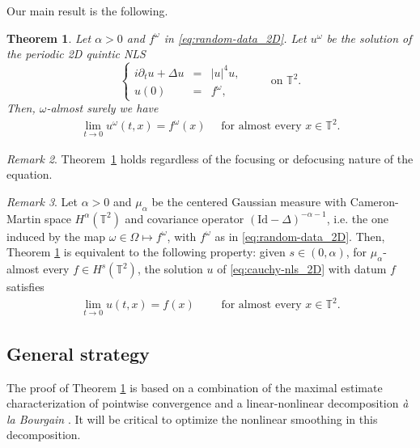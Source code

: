 \documentclass[11pt, xcolor = dvipsnames,reqno
]{amsart}
\newtheorem{thm}{Theorem}[section]
\theoremstyle{definition}
\theoremstyle{remark}
\newtheorem{rmk}[thm]{Remark}
\begin{document}
    Our main result is the following.
    \begin{thm}\label{thm:pconv}
     Let $\alpha > 0$ and $f^{\omega}$ in \eqref{eq:random-data_2D}. 
     Let $u^{\omega}$ be the solution of the periodic 2D quintic NLS 
     \begin{equation}\label{eq:cauchy-nls_2D}
		\left\{
		\begin{array}{rcl}
			i\partial_t u + \Delta u & = & |u|^4 u, 
			\\
			u(0) & = & f^\omega,
		\end{array}
		\right.
        \qquad \text{ on } \mathbb T^2. 
	\end{equation}
    Then, $\omega$-almost surely we have
    \begin{align}\label{eq:cauchy-nls_2D_Convergence}
        \lim_{t \rightarrow 0} u^{\omega}(t,x) = f^{\omega}(x) \quad \text{ for almost every } x \in \mathbb{T}^2.
    \end{align} 
    \end{thm}
    \begin{rmk}
        Theorem~\ref{thm:pconv} holds regardless of the focusing or defocusing nature of the equation. 
    \end{rmk}

    \begin{rmk}
        Let $\alpha > 0$ and $\mu_{\alpha}$ be the centered Gaussian measure with Cameron-Martin space $H^{\alpha}(\mathbb T^2)$ and covariance operator $(\text{Id} - \Delta)^{-\alpha - 1}$, i.e. the one induced by the map $\omega \in \Omega \mapsto f^{\omega}$, with $f^{\omega}$ as in \eqref{eq:random-data_2D}. Then, Theorem \ref{thm:pconv} is equivalent to the following property: given $s \in (0 , \alpha)$, for $\mu_{\alpha}$-almost every $f \in H^s(\mathbb T^2)$, the solution $u$ of \eqref{eq:cauchy-nls_2D} with datum $f$ satisfies
        \begin{align*}
            \lim_{t \rightarrow 0} u(t,x) = f(x) \qquad \text{ for almost every } x \in \mathbb{T}^2.
        \end{align*}
    \end{rmk}

    \subsection*{General strategy}
    The proof of Theorem \ref{thm:pconv} is based on a combination of the maximal estimate characterization of pointwise convergence and a linear-nonlinear decomposition \textit{\`a la Bourgain} \cite{Bourgain1996}.  
    It will be critical to optimize the nonlinear smoothing in this decomposition.
\end{document}
